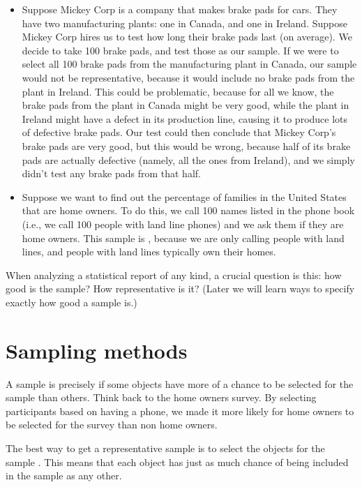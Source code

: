 \documentclass[../../../main.tex]{subfiles}
\begin{document}
\begin{itemize}

  \item Suppose Mickey Corp is a company that makes brake pads for cars. They have two manufacturing plants: one in Canada, and one in Ireland. Suppose Mickey Corp hires us to test how long their brake pads last (on average). We decide to take 100 brake pads, and test those as our sample. If we were to select all 100 brake pads from the manufacturing plant in Canada, our sample would not be representative, because it would include no brake pads from the plant in Ireland. This could be problematic, because for all we know, the brake pads from the plant in Canada might be very good, while the plant in Ireland might have a defect in its production line, causing it to produce lots of defective brake pads. Our test could then conclude that Mickey Corp's brake pads are very good, but this would be wrong, because half of its brake pads are actually defective (namely, all the ones from Ireland), and we simply didn't test any brake pads from that half.
  
  \item Suppose we want to find out the percentage of families in the United States that are home owners. To do this, we call 100 names listed in the phone book (i.e., we call 100 people with land line phones) and we ask them if they are home owners. This sample is , because we are only calling people with land lines, and people with land lines typically own their homes.

\end{itemize}

When analyzing a statistical report of any kind, a crucial question is this: how good is the sample? How representative is it? (Later we will learn ways to specify exactly how good a sample is.)


\section{Sampling methods}

A sample is  precisely if some objects have more of a chance to be selected for the sample than others. Think back to the home owners survey. By selecting participants based on having a phone, we made it more likely for home owners to be selected for the survey than non home owners. 

The best way to get a representative sample is to select the objects for the sample . This means that each object has just as much chance of being included in the sample as any other. 
\end{document}
